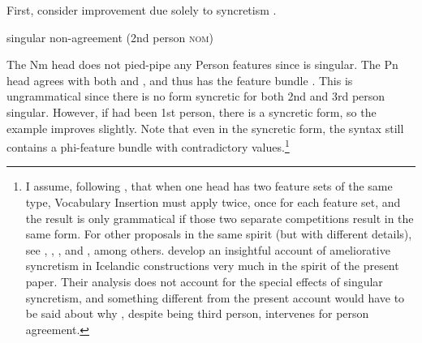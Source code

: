 \documentclass[output=paper]{langscibook}
\begin{document}
First, consider improvement due solely to syncretism \citep[33]{SigurTHsson:1996va}. 

\ea \label{woodsing} 
    \z
\z

\ea \datnom{} singular non-agreement (2nd person \textsc{nom})\smallskip\\
\z

The Nm head does not pied-pipe any Person features since  is singular. The Pn head agrees with both  and , and thus has the feature bundle . This is ungrammatical since there is no form syncretic for both 2nd and 3rd person singular. However, if  had been 1st person, there is a syncretic form, so the example improves slightly. Note that even in the syncretic form, the syntax still contains a phi-feature bundle with contradictory values.\footnote{I assume, following \citet{Bjorkman2016}, that when one head has two feature sets of the same type, Vocabulary Insertion must apply twice, once for each feature set, and the result is only grammatical if those two separate competitions result in the same form. For other proposals in the same spirit (but with different details), see \citet{citko2005nature}, \citet{Kratzer:2009jq}, \citet{bhatt2013locating}, \citet{Asarina2013} and  \citet{CoonKeine2020}, among others. \citet{CoonKeine2020} develop an insightful account of ameliorative syncretism in Icelandic  constructions very much in the spirit of the present paper. Their analysis  does not account for the special effects of singular \sti syncretism, and something different from the present account would have to be said about why \stin{}, despite being third person, intervenes for person agreement.  } 
\end{document}
